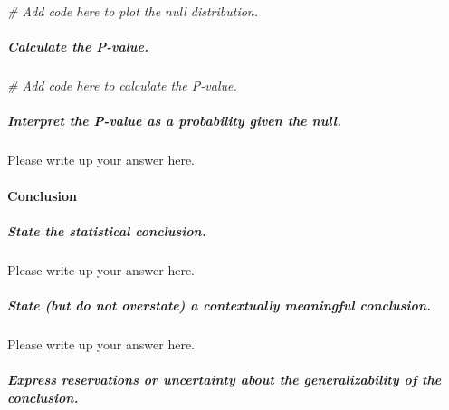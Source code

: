 \documentclass[
]{book}
\newenvironment{Shaded}{\begin{snugshade}}{\end{snugshade}}
\newcommand{\CommentTok}[1]{\textcolor[rgb]{0.56,0.35,0.01}{\textit{#1}}}
\begin{document}
\begin{Shaded}
\begin{Highlighting}[]
\CommentTok{\# Add code here to plot the null distribution.}
\end{Highlighting}
\end{Shaded}

\hypertarget{calculate-the-p-value.-2}{%
\subparagraph*{Calculate the P-value.}\label{calculate-the-p-value.-2}}

\begin{Shaded}
\begin{Highlighting}[]
\CommentTok{\# Add code here to calculate the P{-}value.}
\end{Highlighting}
\end{Shaded}

\hypertarget{interpret-the-p-value-as-a-probability-given-the-null.-2}{%
\subparagraph*{Interpret the P-value as a probability given the null.}\label{interpret-the-p-value-as-a-probability-given-the-null.-2}}

Please write up your answer here.

\hypertarget{conclusion-2}{%
\paragraph*{Conclusion}\label{conclusion-2}}

\hypertarget{state-the-statistical-conclusion.-2}{%
\subparagraph*{State the statistical conclusion.}\label{state-the-statistical-conclusion.-2}}

Please write up your answer here.

\hypertarget{state-but-do-not-overstate-a-contextually-meaningful-conclusion.-2}{%
\subparagraph*{State (but do not overstate) a contextually meaningful conclusion.}\label{state-but-do-not-overstate-a-contextually-meaningful-conclusion.-2}}

Please write up your answer here.

\hypertarget{express-reservations-or-uncertainty-about-the-generalizability-of-the-conclusion.-2}{%
\subparagraph*{Express reservations or uncertainty about the generalizability of the conclusion.}\label{express-reservations-or-uncertainty-about-the-generalizability-of-the-conclusion.-2}}
\end{document}
